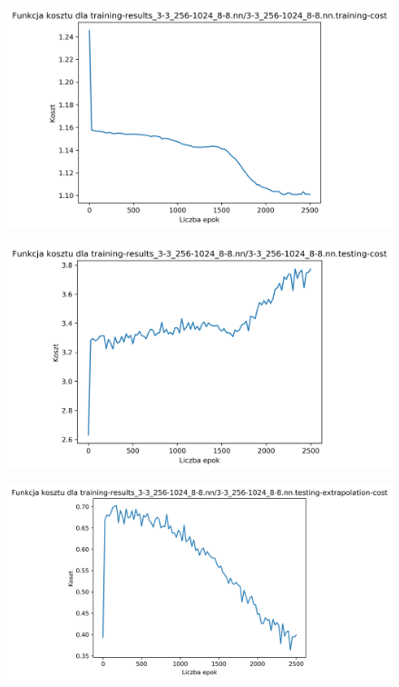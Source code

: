 \documentclass{classrep}
\begin{document}
{{\begin{figure}[!htbp]
            \end{figure}
            \begin{figure}[!htbp]
                \centering
                \includegraphics[width=120mm]{wykresy/3-3_256-1024_8-8_nn_training-cost.png}
            \end{figure}
            \begin{figure}[!htbp]
                \centering
                \includegraphics[width=120mm]{wykresy/3-3_256-1024_8-8_nn_testing-cost.png}
            \end{figure}
            \begin{figure}[!htbp]
                \centering
                \includegraphics[width=140mm]{wykresy/3-3_256-1024_8-8_nn_testing-extrapolation-cost.png}
            \end{figure}
            \FloatBarrier
        }

    }
\end{document}
